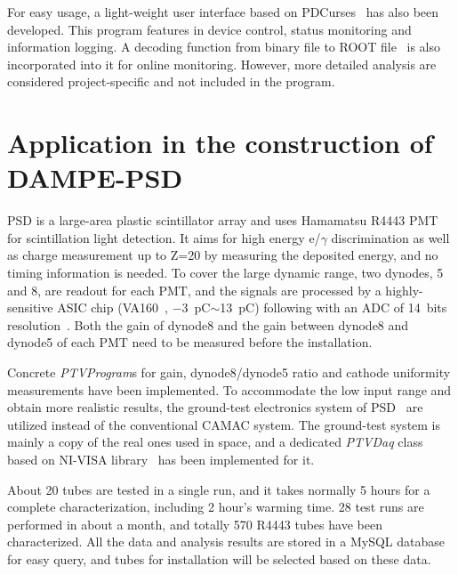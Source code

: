 \documentclass[a4paper,10pt,twoside]{cpc-hepnp}
\begin{document}
\begin{multicols}{2}
	
For easy usage, a light-weight user interface based on PDCurses~\citep{pdcurses} has also been developed.
This program features in device control, status monitoring and information logging.
A decoding function from binary file to ROOT file~\citep{root} is also incorporated into it for online monitoring.
However, more detailed analysis are considered project-specific and not included in the program. 

\section{Application in the construction of DAMPE-PSD}
\label{sec:application}

PSD is a large-area plastic scintillator array and uses Hamamatsu R4443 PMT for scintillation light detection.
It aims for high energy e/$\gamma$ discrimination as well as charge measurement up to Z=20 by measuring the deposited energy, and no timing information is needed.
To cover the large dynamic range, two dynodes, 5 and 8, are readout for each PMT, 
and the signals are processed by a highly-sensitive ASIC chip (VA160~\citep{va160}, \SI{-3}{\pico\coulomb}$\sim$\SI{13}{\pico\coulomb}) following with an ADC of 14~bits resolution~\citep{fee}. 
Both the gain of dynode8 and the gain between dynode8 and dynode5 of each PMT need to be  measured before the installation.

Concrete \textit{PTVProgram}s for gain, dynode8/dynode5 ratio and cathode uniformity measurements have been implemented.
To accommodate the low input range and obtain more realistic results, the ground-test electronics system of PSD~\citep{fee} are utilized instead of the conventional CAMAC system. 
The ground-test system is mainly a copy of the real ones used in space, and a dedicated \textit{PTVDaq} class based on NI-VISA library~\citep{ni_visa} has been implemented for it.

About 20 tubes are tested in a single run, and it takes normally 5 hours for a complete characterization, including 2 hour's warming time. 
28 test runs are performed in about a month, and totally 570 R4443 tubes have been characterized. 
All the data and analysis results are stored in a MySQL database for easy query, and tubes for installation will be selected based on these data.


\end{multicols}
\end{document}
